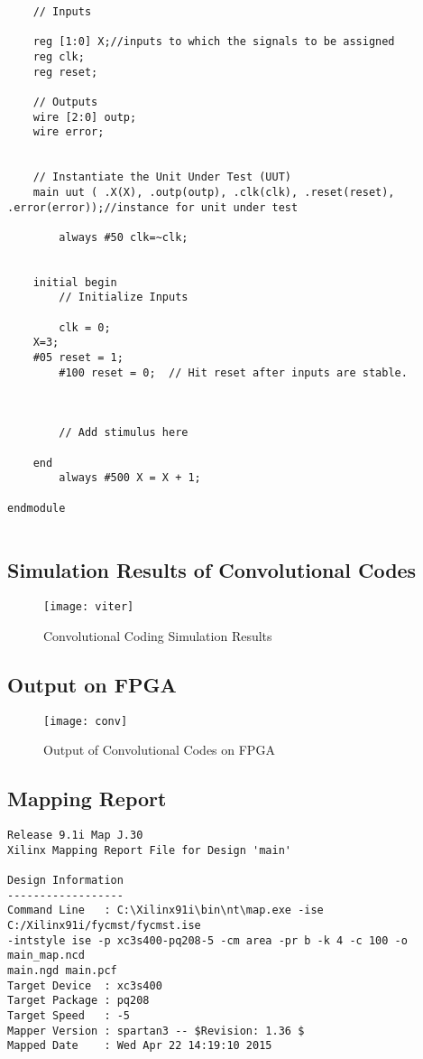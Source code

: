 \documentclass[14pt]{report}
\begin{document}
{\begin{verbatim}
	// Inputs
	
	reg [1:0] X;//inputs to which the signals to be assigned
	reg clk;
	reg reset;

	// Outputs
	wire [2:0] outp;
	wire error;
	

	// Instantiate the Unit Under Test (UUT)
	main uut ( .X(X), .outp(outp), .clk(clk), .reset(reset), .error(error));//instance for unit under test
	
        always #50 clk=~clk;


	initial begin
		// Initialize Inputs
		
		clk = 0;
	X=3;
	#05 reset = 1;
		#100 reset = 0;  // Hit reset after inputs are stable.

		
        
		// Add stimulus here

	end
		always #500 X = X + 1;
      
endmodule


\end{verbatim}
\subsection{Simulation Results of Convolutional Codes}
\begin{figure}[ht]
\centering
\texttt{[image: viter]}
\caption{Convolutional Coding Simulation Results}
\end{figure}
\subsection*{Output on FPGA}
\begin{figure}[ht]
\centering
\texttt{[image: conv]}
\caption{Output of Convolutional Codes on FPGA}
\end{figure}

\subsection*{Mapping Report}
\begin{verbatim}
Release 9.1i Map J.30
Xilinx Mapping Report File for Design 'main'

Design Information
------------------
Command Line   : C:\Xilinx91i\bin\nt\map.exe -ise C:/Xilinx91i/fycmst/fycmst.ise
-intstyle ise -p xc3s400-pq208-5 -cm area -pr b -k 4 -c 100 -o main_map.ncd
main.ngd main.pcf 
Target Device  : xc3s400
Target Package : pq208
Target Speed   : -5
Mapper Version : spartan3 -- $Revision: 1.36 $
Mapped Date    : Wed Apr 22 14:19:10 2015


\end{verbatim}}
\end{document}
